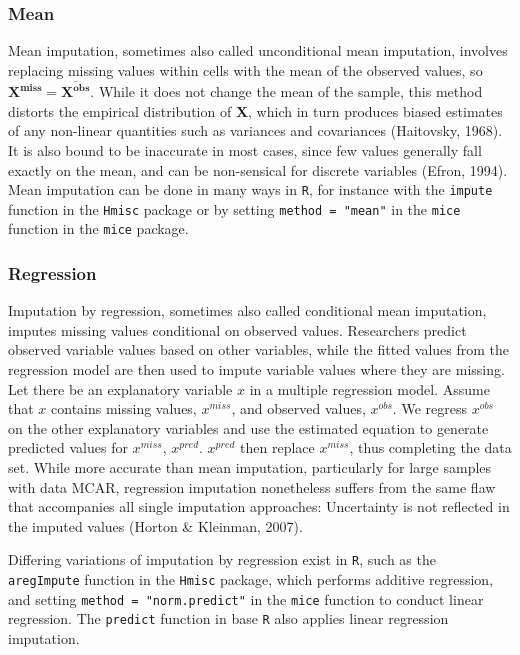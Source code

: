 \documentclass[12pt,econ]{sources/authesis}
\begin{document}
\hypertarget{ordmiss-theory-impute-mean}{%
\subsubsection{Mean}\label{ordmiss-theory-impute-mean}}

Mean imputation, sometimes also called unconditional mean imputation, involves replacing missing values within cells with the mean of the observed values, so \(\bm{X^{miss}} = \bm{\overline{X^{obs}}}\). While it does not change the mean of the sample, this method distorts the empirical distribution of \(\bm{X}\), which in turn produces biased estimates of any non-linear quantities such as variances and covariances (Haitovsky, 1968). It is also bound to be inaccurate in most cases, since few values generally fall exactly on the mean, and can be non-sensical for discrete variables (Efron, 1994). Mean imputation can be done in many ways in \texttt{R}, for instance with the \texttt{impute} function in the \texttt{Hmisc} package or by setting \texttt{method\ =\ "mean"} in the \texttt{mice} function in the \texttt{mice} package.

\hypertarget{ordmiss-theory-impute-regress}{%
\subsubsection{Regression}\label{ordmiss-theory-impute-regress}}

Imputation by regression, sometimes also called conditional mean imputation, imputes missing values conditional on observed values. Researchers predict observed variable values based on other variables, while the fitted values from the regression model are then used to impute variable values where they are missing. Let there be an explanatory variable \(x\) in a multiple regression model. Assume that \(x\) contains missing values, \(x^{miss}\), and observed values, \(x^{obs}\). We regress \(x^{obs}\) on the other explanatory variables and use the estimated equation to generate predicted values for \(x^{miss}\), \(x^{pred}\). \(x^{pred}\) then replace \(x^{miss}\), thus completing the data set. While more accurate than mean imputation, particularly for large samples with data MCAR, regression imputation nonetheless suffers from the same flaw that accompanies all single imputation approaches: Uncertainty is not reflected in the imputed values (Horton \& Kleinman, 2007).

Differing variations of imputation by regression exist in \texttt{R}, such as the \texttt{aregImpute} function in the \texttt{Hmisc} package, which performs additive regression, and setting \texttt{method\ =\ "norm.predict"} in the \texttt{mice} function to conduct linear regression. The \texttt{predict} function in base \texttt{R} also applies linear regression imputation.
\end{document}

